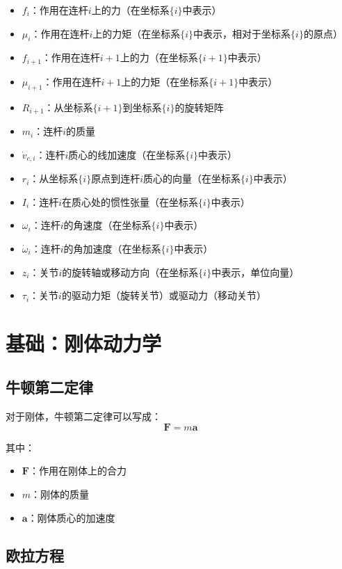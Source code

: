\documentclass[12pt,a4paper]{article}
\begin{document}
\begin{itemize}
\item $f_i$：作用在连杆$i$上的力（在坐标系$\{i\}$中表示）
\item $\mu_i$：作用在连杆$i$上的力矩（在坐标系$\{i\}$中表示，相对于坐标系$\{i\}$的原点）
\item $f_{i+1}$：作用在连杆$i+1$上的力（在坐标系$\{i+1\}$中表示）
\item $\mu_{i+1}$：作用在连杆$i+1$上的力矩（在坐标系$\{i+1\}$中表示）
\item $R_{i+1}$：从坐标系$\{i+1\}$到坐标系$\{i\}$的旋转矩阵
\item $m_i$：连杆$i$的质量
\item $\dot{v}_{c,i}$：连杆$i$质心的线加速度（在坐标系$\{i\}$中表示）
\item $r_i$：从坐标系$\{i\}$原点到连杆$i$质心的向量（在坐标系$\{i\}$中表示）
\item $I_i$：连杆$i$在质心处的惯性张量（在坐标系$\{i\}$中表示）
\item $\omega_i$：连杆$i$的角速度（在坐标系$\{i\}$中表示）
\item $\dot{\omega}_i$：连杆$i$的角加速度（在坐标系$\{i\}$中表示）
\item $z_i$：关节$i$的旋转轴或移动方向（在坐标系$\{i\}$中表示，单位向量）
\item $\tau_i$：关节$i$的驱动力矩（旋转关节）或驱动力（移动关节）
\end{itemize}

\section{基础：刚体动力学}

\subsection{牛顿第二定律}

对于刚体，牛顿第二定律可以写成：
\begin{equation}
\mathbf{F} = m \mathbf{a}
\end{equation}

其中：
\begin{itemize}
\item $\mathbf{F}$：作用在刚体上的合力
\item $m$：刚体的质量
\item $\mathbf{a}$：刚体质心的加速度
\end{itemize}

\subsection{欧拉方程}
\end{document}
